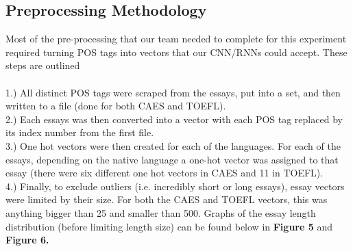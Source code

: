 \documentclass[12pt]{article}
\newcommand\tab[1][1cm]{\hspace*{#1}}
\begin{document}
 \subsection{Preprocessing Methodology}
 \tab Most of the pre-processing that our team needed to complete for this experiment required turning POS tags into vectors that our CNN/RNNs could accept. These steps are outlined\\
 \\
 1.) All distinct POS tags were scraped from the essays, put into a set, and then written to a file (done for both CAES and TOEFL).\\
 2.) Each essays was then converted into a vector with each POS tag replaced by its index number from the first file.\\
 3.) One hot vectors were then created for each of the languages. For each of the essays, depending on the native language a  one-hot vector was assigned to that essay (there were six different one hot vectors in CAES and 11 in TOEFL).\\
 4.) Finally, to exclude outliers (i.e. incredibly short or long essays), essay vectors were limited by their size. For both the CAES and TOEFL vectors, this was anything bigger than 25 and smaller than 500. Graphs of the essay length distribution (before limiting length size) can be found below in \textbf{Figure 5} and \textbf{Figure 6.}
\end{document}
